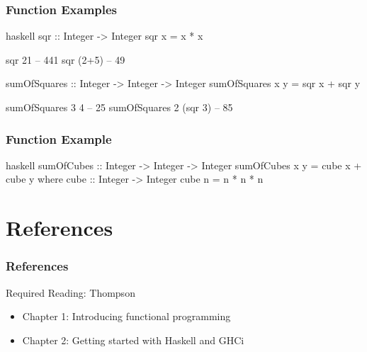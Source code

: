 \documentclass[dvipsnames]{beamer}
\theoremstyle{plain}
\begin{document}
\begin{frame}[fragile]
  \frametitle{Function Examples}

  \begin{exampleblock}{}
    \begin{pygments}{haskell}
sqr :: Integer -> Integer
sqr x = x * x

sqr 21    -- 441
sqr (2+5) -- 49

sumOfSquares :: Integer -> Integer -> Integer
sumOfSquares x y = sqr x + sqr y

sumOfSquares 3 4       -- 25
sumOfSquares 2 (sqr 3) -- 85
    \end{pygments}
  \end{exampleblock}
\end{frame}

\begin{frame}[fragile]
  \frametitle{Function Example}

  \begin{exampleblock}{}
    \begin{pygments}{haskell}
sumOfCubes :: Integer -> Integer -> Integer
sumOfCubes x y = cube x + cube y
  where
    cube :: Integer -> Integer
    cube n = n * n * n
    \end{pygments}
  \end{exampleblock}
\end{frame}

\section*{References}

\begin{frame}
  \frametitle{References}

  \begin{block}{Required Reading: Thompson}
    \begin{itemize}
      \item Chapter 1: \alert{Introducing functional programming}
      \item Chapter 2: \alert{Getting started with Haskell and GHCi}
    \end{itemize}
  \end{block}
\end{frame}
\end{document}
